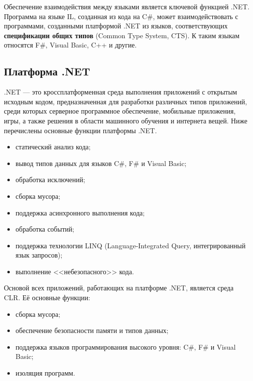 Обеспечение взаимодействия между языками является ключевой функцией .NET. Программа на языке IL, созданная из кода на C\#, может взаимодействовать с программами, созданными платформой .NET из языков, соответствующих \textbf{спецификации общих типов} (Common Type System, CTS). К таким языкам относятся F\#, Visual Basic, C++ и другие. \cite{dotnet}



\subsection{Платформа .NET}

.NET \cite{dotnet} --- это кроссплатформенная среда выполнения приложений с открытым исходным кодом, предназначенная для разработки различных типов приложений, среди которых серверное программное обеспечение, мобильные приложения, игры, а также решения в области машинного обучения и интернета вещей. Ниже перечислены основные функции платформы .NET. \cite{dotnet_intro}

\begin{itemize}[label*=---]
	\item статический анализ кода;
	\item вывод типов данных для языков C\#, F\# и Visual Basic;
	\item обработка исключений;
	\item сборка мусора;
	\item поддержка асинхронного выполнения кода;
	\item обработка событий;
	\item поддержка технологии LINQ (Language-Integrated Query, интегрированный язык запросов);
	\item выполнение <<небезопасного>> кода. \cite{dotnet_unsafe} %
\end{itemize}

Основой всех приложений, работающих на платформе .NET, является среда CLR. Её основные функции: \cite{dotnet_intro} \cite{dotnet_clr_intro}

\begin{itemize}[label*=---]
	\item сборка мусора;
	\item обеспечение безопасности памяти и типов данных;
	\item поддержка языков программирования высокого уровня: C\#, F\# и Visual Basic;
	\item изоляция программ.
\end{itemize}


